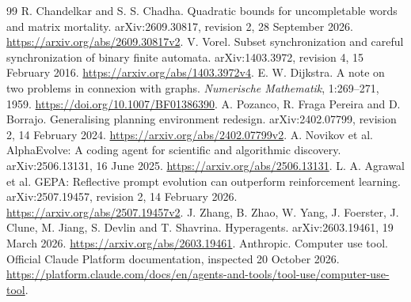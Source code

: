 \documentclass[11pt,letterpaper]{article}
\theoremstyle{definition}\newtheorem{definition}[theorem]{Definition}
\theoremstyle{remark}\newtheorem{remark}[theorem]{Remark}
\begin{document}
\begin{thebibliography}{99}
 R. Chandelkar and S. S. Chadha. Quadratic bounds for uncompletable words and matrix mortality. arXiv:2609.30817, revision 2, 28 September 2026. \url{https://arxiv.org/abs/2609.30817v2}.
 V. Vorel. Subset synchronization and careful synchronization of binary finite automata. arXiv:1403.3972, revision 4, 15 February 2016. \url{https://arxiv.org/abs/1403.3972v4}.
 E. W. Dijkstra. A note on two problems in connexion with graphs. \emph{Numerische Mathematik}, 1:269--271, 1959. \url{https://doi.org/10.1007/BF01386390}.
 A. Pozanco, R. Fraga Pereira and D. Borrajo. Generalising planning environment redesign. arXiv:2402.07799, revision 2, 14 February 2024. \url{https://arxiv.org/abs/2402.07799v2}.
 A. Novikov et al. AlphaEvolve: A coding agent for scientific and algorithmic discovery. arXiv:2506.13131, 16 June 2025. \url{https://arxiv.org/abs/2506.13131}.
 L. A. Agrawal et al. GEPA: Reflective prompt evolution can outperform reinforcement learning. arXiv:2507.19457, revision 2, 14 February 2026. \url{https://arxiv.org/abs/2507.19457v2}.
 J. Zhang, B. Zhao, W. Yang, J. Foerster, J. Clune, M. Jiang, S. Devlin and T. Shavrina. Hyperagents. arXiv:2603.19461, 19 March 2026. \url{https://arxiv.org/abs/2603.19461}.
 Anthropic. Computer use tool. Official Claude Platform documentation, inspected 20 October 2026. \url{https://platform.claude.com/docs/en/agents-and-tools/tool-use/computer-use-tool}.
\end{thebibliography}
\end{document}
